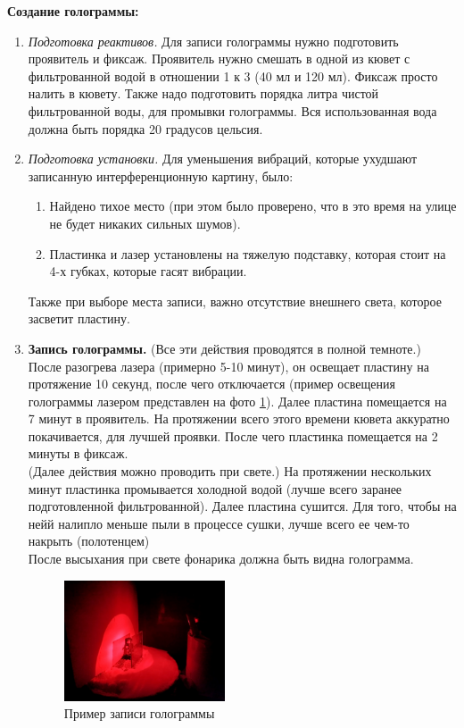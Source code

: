 \documentclass[aps,twocolumn,secnumarabic,balancelastpage,amsmath,amssymb,nofootinbib, floatfix]{revtex4-1}
\begin{document}
\textbf{Создание голограммы:}
\begin{enumerate}
	\item\textit{Подготовка реактивов.} Для записи голограммы нужно подготовить проявитель и фиксаж. Проявитель нужно смешать в одной из кювет с фильтрованной водой в отношении 1 к 3 (40 мл и 120 мл). Фиксаж просто налить в кювету. Также надо подготовить порядка литра чистой фильтрованной воды, для промывки голограммы. Вся использованная вода должна быть порядка 20 градусов цельсия. 
	\item\textit{Подготовка установки.} Для уменьшения вибраций, которые ухудшают записанную интерференционную картину, было:
	\begin{enumerate}
		\item Найдено тихое место (при этом было проверено, что в это время на улице не будет никаких сильных шумов).
		\item Пластинка и лазер установлены на тяжелую подставку, которая стоит на 4-х губках, которые гасят вибрации.
	\end{enumerate}
	Также при выборе места записи, важно отсутствие внешнего света, которое засветит пластину.
	\item\textbf{Запись голограммы.} (Все эти действия проводятся в полной темноте.)\\После разогрева лазера (примерно 5-10 минут), он освещает пластину на протяжение 10 секунд, после чего отключается (пример освещения голограммы лазером представлен на фото \ref{fig:laser_lighting}). Далее пластина помещается на 7 минут в проявитель. На протяжении всего этого времени кювета аккуратно покачивается, для лучшей проявки. После чего пластинка помещается на 2 минуты в фиксаж. \\
	(Далее действия можно проводить при свете.) На протяжении нескольких минут пластинка промывается холодной водой (лучше всего заранее подготовленной фильтрованной). Далее пластина сушится. Для того, чтобы на нейй налипло меньше пыли в процессе сушки, лучше всего ее чем-то накрыть (полотенцем)\\
	После высыхания при свете фонарика должна быть видна голограмма.
	\begin{figure}[H]
		\centering
		\includegraphics[width=0.45\textwidth]{images/laser_lighting.jpeg}
		\caption{Пример записи голограммы}
		\label{fig:laser_lighting}
	\end{figure}
\end{enumerate}
\end{document}
